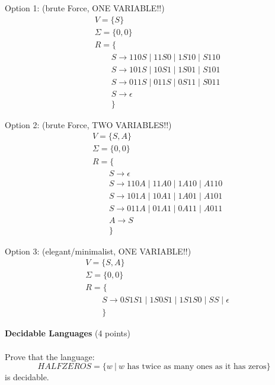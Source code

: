 \documentclass[12pt]{article}
\newenvironment{question}[2][Question]{\begin{trivlist}
\item[\hskip \labelsep {\bfseries #1}\hskip \labelsep {\bfseries #2.}]}{\end{trivlist}}
\newenvironment{solution}[1][Solution:]{\begin{trivlist}
\item[\hskip \labelsep {\bfseries #1}\hskip \labelsep {\bfseries}]\color{blue}}{\end{trivlist}}
\begin{document}
	\begin{solution}
 \;
 
 Option 1: (brute Force, ONE VARIABLE!!)
    \begin{align*}
        &V = \{S\}\\
        &\Sigma = \{ 0, 0 \}\\
        &R = \{ \\
        & \qquad  S \rightarrow 110S \;\vert\; 11S0 \;\vert\; 1S10 \;\vert\; S110 \\
        & \qquad  S \rightarrow 101S \;\vert\; 10S1 \;\vert\; 1S01 \;\vert\; S101 \\
        & \qquad  S \rightarrow 011S \;\vert\; 011S \;\vert\; 0S11 \;\vert\; S011 \\  
        & \qquad  S \rightarrow \epsilon \\
        & \qquad \} 
    \end{align*}

 Option 2: (brute Force, TWO VARIABLES!!)
    \begin{align*}
        &V = \{S, A\}\\
        &\Sigma = \{ 0, 0 \}\\
        &R = \{ \\
        & \qquad  S \rightarrow  \epsilon \\
        & \qquad  S \rightarrow 110A \;\vert\; 11A0 \;\vert\; 1A10 \;\vert\; A110 \\
        & \qquad  S \rightarrow 101A \;\vert\; 10A1 \;\vert\; 1A01 \;\vert\; A101 \\
        & \qquad  S \rightarrow 011A \;\vert\; 01A1 \;\vert\; 0A11 \;\vert\; A011 \\  
        & \qquad  A \rightarrow S \\
        & \qquad \} 
    \end{align*}

 Option 3: (elegant/minimalist, ONE VARIABLE!!)
    \begin{align*}
        &V = \{S, A\}\\
        &\Sigma = \{ 0, 0 \}\\
        &R = \{ \\
        & \qquad  S \rightarrow 0S1S1 \;\vert\; 1S0S1 \;\vert\; 1S1S0 \;\vert\; SS \;\vert\;  \epsilon \\
        & \qquad \} 
    \end{align*}
    
	\end{solution}

\clearpage
\begin{question}{9}\textbf{Decidable Languages} (4 points)\\\\
Prove that the language:
\[HALFZEROS = \{w \ | \ w \text{ has twice as many ones as it has zeros}\} \] is decidable.
\end{question}
\end{document}

